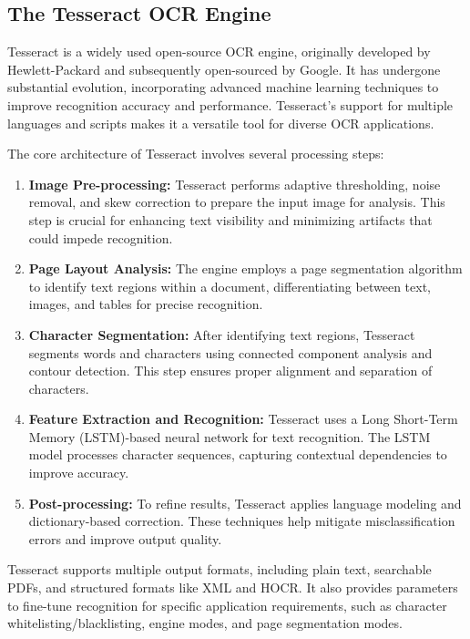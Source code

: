 \subsection{The Tesseract OCR Engine}

Tesseract is a widely used open-source OCR engine, originally developed by Hewlett-Packard and subsequently open-sourced by Google. It has undergone substantial evolution, incorporating advanced machine learning techniques to improve recognition accuracy and performance. Tesseract's support for multiple languages and scripts makes it a versatile tool for diverse OCR applications.

The core architecture of Tesseract involves several processing steps:

\begin{enumerate}
    \item \textbf{Image Pre-processing:} Tesseract performs adaptive thresholding, noise removal, and skew correction to prepare the input image for analysis. This step is crucial for enhancing text visibility and minimizing artifacts that could impede recognition.
    
    \item \textbf{Page Layout Analysis:} The engine employs a page segmentation algorithm to identify text regions within a document, differentiating between text, images, and tables for precise recognition.
    
    \item \textbf{Character Segmentation:} After identifying text regions, Tesseract segments words and characters using connected component analysis and contour detection. This step ensures proper alignment and separation of characters.
    
    \item \textbf{Feature Extraction and Recognition:} Tesseract uses a Long Short-Term Memory (LSTM)-based neural network for text recognition. The LSTM model processes character sequences, capturing contextual dependencies to improve accuracy.
    
    \item \textbf{Post-processing:} To refine results, Tesseract applies language modeling and dictionary-based correction. These techniques help mitigate misclassification errors and improve output quality.
\end{enumerate}

Tesseract supports multiple output formats, including plain text, searchable PDFs, and structured formats like XML and HOCR. It also provides parameters to fine-tune recognition for specific application requirements, such as character whitelisting/blacklisting, engine modes, and page segmentation modes.

